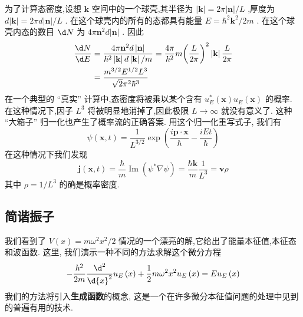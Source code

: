 为了计算态密度,设想 $\mathbf{k}$ 空间中的一个球壳,其半径为 $\left| \mathbf{k}\right| = {2\pi }\left| \mathbf{n}\right| /L$ ,厚度为 $d\left| \mathbf{k}\right| = {2\pi d}\left| \mathbf{n}\right| /L$ . 在这个球壳内的所有的态都具有能量 $E = {\hbar }^{2}{\mathbf{k}}^{2}/{2m}$ . 在这个球壳内态的数目 ${\d N}$ 为 ${4\pi }{\mathbf{n}}^{2}d\left| \mathbf{n}\right|$ . 因此
\begin{equation}
\begin{aligned}
	\frac{\d N}{\d E} &= \frac{{4\pi }{\mathbf{n}}^{2}d\left| \mathbf{n}\right| }{{\hbar }^{2}\left| \mathbf{k}\right| d\left| \mathbf{k}\right| /m} = \frac{4\pi }{{\hbar }^{2}}m{\left( \frac{L}{2\pi }\right) }^{2}\left| \mathbf{k}\right| \frac{L}{2\pi }\\
	&= \frac{{m}^{3/2}{E}^{1/2}{L}^{3}}{\sqrt{2}{\pi }^{2}{\hbar }^{3}}
\end{aligned}
\end{equation}
在一个典型的 “真实” 计算中,态密度将被乘以某个含有 ${u}_{E}^{ * }\left( \mathbf{x}\right) {u}_{E}\left( \mathbf{x}\right)$ 的概率. 在这种情况下,因子 ${L}^{3}$ 将被明显地消掉了,因此极限 $L \rightarrow \infty$ 就没有意义了. 这种 “大箱子” 归一化也产生了概率流的正确答案. 用这个归一化重写式子, 我们有
\begin{equation}
\psi \left( {\mathbf{x}, t}\right) = \frac{1}{{L}^{3/2}}\exp \left( {\frac{i\mathbf{p} \cdot \mathbf{x}}{\hbar } - \frac{iEt}{\hbar }}\right)
\end{equation}
在这种情况下我们发现
\begin{equation}
\mathbf{j}\left( {\mathbf{x}, t}\right) = \frac{\hbar }{m}\operatorname{Im}\left( {{\psi }^{ * }\nabla \psi }\right) = \frac{\hbar \mathbf{k}}{m}\frac{1}{{L}^{3}} = \mathbf{v}\rho
\end{equation}
其中 $\rho = 1/{L}^{3}$ 的确是概率密度.
\subsection{简谐振子}
我们看到了 $V\left( x\right) = m{\omega }^{2}{x}^{2}/2$ 情况的一个漂亮的解,它给出了能量本征值,本征态和波函数. 这里, 我们演示一种不同的方法求解这个微分方程
\begin{equation}
- \frac{{\hbar }^{2}}{2m}\frac{{\d}^{2}}{\d {x}^{2}}{u}_{E}\left( x\right) + \frac{1}{2}m{\omega }^{2}{x}^{2}{u}_{E}\left( x\right) = E{u}_{E}\left( x\right)
\end{equation}
我们的方法将引入\textbf{生成函数}的概念, 这是一个在许多微分本征值问题的处理中见到的普遍有用的技术.

